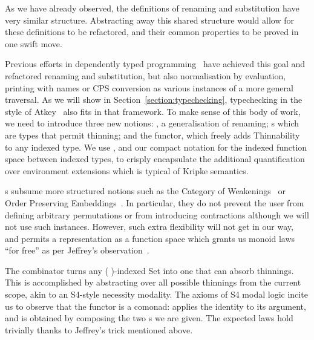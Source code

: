 \begin{center}
\end{center}

As we have already observed, the definitions of renaming and substitution have very
similar structure. Abstracting away this shared structure would allow for these
definitions to be refactored, and their common properties to be proved in one swift
move.

Previous efforts in dependently typed
programming~\cite{benton2012strongly,allais2017type}
have achieved this goal and refactored renaming and substitution,
but also normalisation by evaluation, printing with names or CPS conversion
as various instances of a more general traversal. As we will show in Section~\ref{section:typechecking},
typechecking in the style of Atkey~\citeyear{atkey2015algebraic} also
fits in that framework. To make sense of this body of work, we
need to introduce three new notions: , a generalisation of
renaming; s which are types that permit thinning; and the
 functor, which freely adds Thinnability to any indexed type.
We use , and our compact notation for the indexed function space
between indexed types, to crisply encapsulate the additional quantification
over environment extensions which is typical of Kripke semantics.
\label{def:thinning}
\begin{center}
\end{center}

s subsume more structured notions such as the Category of
Weakenings~\cite{altenkirch1995categorical} or Order Preserving
Embeddings~\cite{chapman2009type}. In particular, they do not prevent the
user from defining arbitrary permutations or from introducing contractions
although we will not use such instances. However, such extra flexibility
will not get in our way, and permits a representation as a function space
which grants us monoid laws ``for free'' as per Jeffrey's
observation~\citeyear{jeffrey2011assoc}.

The  combinator turns any ( )-indexed Set into one that can
absorb thinnings. This is accomplished by abstracting over all possible thinnings
from the current scope, akin to an S4-style necessity modality. The axioms of S4
modal logic incite us to observe that the functor  is a comonad: 
applies the identity  to its argument, and  is obtained
by composing the two s we are given. The expected laws hold trivially
thanks to Jeffrey's trick mentioned above.

